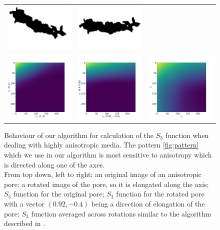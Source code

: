 \documentclass[reprint,amsmath,amssymb,aps,pre,showkeys,showpacs]{revtex4-1}
\begin{document}
\begin{figure}[!htp]
  \centering
  \begin{tabular}{ccc}
    \includegraphics[width=0.3\linewidth, frame]{images/aniso.png} &
    \includegraphics[width=0.3\linewidth, frame]{images/aniso-rot.png} & \\
    \includegraphics[width=0.3\linewidth]{images/aniso-s3.png} &
    \includegraphics[width=0.3\linewidth]{images/aniso-rot-s3.png} &
    \includegraphics[width=0.3\linewidth]{images/aniso-avg-s3.png} \\
  \end{tabular}
  \caption{Behaviour of our algorithm for calculation of the $S_3$ function
    when dealing with highly anisotropic media. The pattern \cref{fig:pattern}
    which we use in our algorithm is most sensitive to anisotropy which is
    directed along one of the axes. \\
    From top down, left to right: an original image of an anisotropic pore; a
    rotated image of the pore, so it is elongated along the axis; $S_3$ function
    for the original pore; $S_3$ function for the rotated pore with a vector
    $(0.92, -0.4)$ being a direction of elongation of the pore; $S_3$ function
    averaged across rotations similar to the algorithm described in
    \cite{berryman1988,SMITH1988176,malmir2018}.}
  \label{fig:aniso}
\end{figure}
\end{document}

